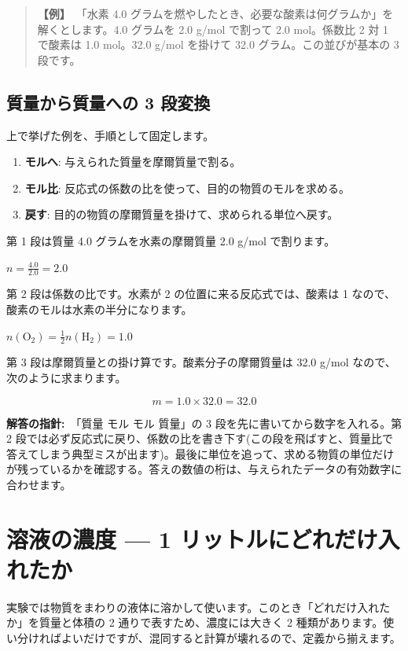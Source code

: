 \documentclass{article}
\begin{document}
\begin{quote}
\textbf{【例】}\ 「水素 4.0 グラムを燃やしたとき、必要な酸素は何グラムか」を解くとします。4.0 グラムを 2.0 g/mol で割って 2.0 mol。係数比 2 対 1 で酸素は 1.0 mol。32.0 g/mol を掛けて 32.0 グラム。この並びが基本の 3 段です。
\end{quote}

\subsection{質量から質量への 3 段変換}

上で挙げた例を、手順として固定します。

\begin{enumerate}
\item \textbf{モルへ}: 与えられた質量を摩爾質量で割る。
\item \textbf{モル比}: 反応式の係数の比を使って、目的の物質のモルを求める。
\item \textbf{戻す}: 目的の物質の摩爾質量を掛けて、求められる単位へ戻す。
\end{enumerate}

第 1 段は質量 4.0 グラムを水素の摩爾質量 2.0 g/mol で割ります。

\( n = \frac{4.0}{2.0} = 2.0 \)

第 2 段は係数の比です。水素が 2 の位置に来る反応式では、酸素は 1 なので、酸素のモルは水素の半分になります。

\( n(\mathrm{O}_{2}) = \frac{1}{2} n(\mathrm{H}_{2}) = 1.0 \)

第 3 段は摩爾質量との掛け算です。酸素分子の摩爾質量は 32.0 g/mol なので、次のように求まります。

\[ m = 1.0 \times 32.0 = 32.0 \]

\textbf{解答の指針:}\ 「質量 モル モル 質量」の 3 段を先に書いてから数字を入れる。第 2 段では必ず反応式に戻り、係数の比を書き下す(この段を飛ばすと、質量比で答えてしまう典型ミスが出ます)。最後に単位を追って、求める物質の単位だけが残っているかを確認する。答えの数値の桁は、与えられたデータの有効数字に合わせます。

\section{溶液の濃度 — 1 リットルにどれだけ入れたか}

実験では物質をまわりの液体に溶かして使います。このとき「どれだけ入れたか」を質量と体積の 2 通りで表すため、濃度には大きく 2 種類があります。使い分ければよいだけですが、混同すると計算が壊れるので、定義から揃えます。
\end{document}
